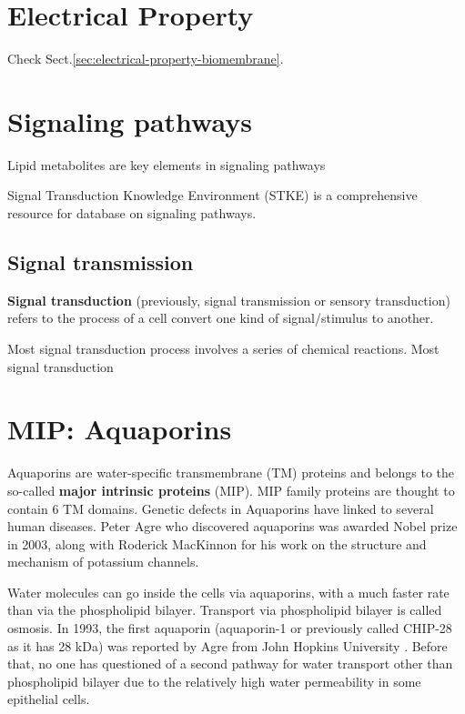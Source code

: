 \section{Electrical Property}

Check Sect.\ref{sec:electrical-property-biomembrane}.

\section{Signaling pathways}
\label{sec:signaling-pathways}


Lipid metabolites are key elements in signaling pathways

Signal Transduction Knowledge Environment (STKE) is a comprehensive
resource for database on signaling pathways.

\subsection{Signal transmission}
\label{sec:signal-transmission}

{\bf Signal transduction} (previously, signal transmission or sensory
transduction) refers to the process of a cell convert one kind of
signal/stimulus to another.

Most signal transduction process involves a series of chemical
reactions.  Most signal transduction 



\section{MIP: Aquaporins}
\label{sec:aquaporins}
\label{sec:MIP-major-intrinsic-protein}

Aquaporins are water-specific transmembrane (TM) proteins and belongs to the
so-called {\bf major intrinsic proteins} (MIP). MIP family proteins are thought
to contain 6 TM domains. Genetic defects in Aquaporins have linked to several
human diseases. Peter Agre who discovered aquaporins was awarded Nobel prize in
2003, along with Roderick MacKinnon for his work on the structure and mechanism
of potassium channels. 

Water molecules can go inside the cells via aquaporins, with a much faster rate
than via the phospholipid bilayer. Transport via phospholipid bilayer is called
osmosis. In 1993, the first aquaporin (aquaporin-1 or previously called CHIP-28
as it has 28 kDa) was reported by Agre from John Hopkins University
\citep{agre1993}. Before that, no one has questioned of a second pathway for
water transport other than phospholipid bilayer due to the relatively high water
permeability in some epithelial cells.


